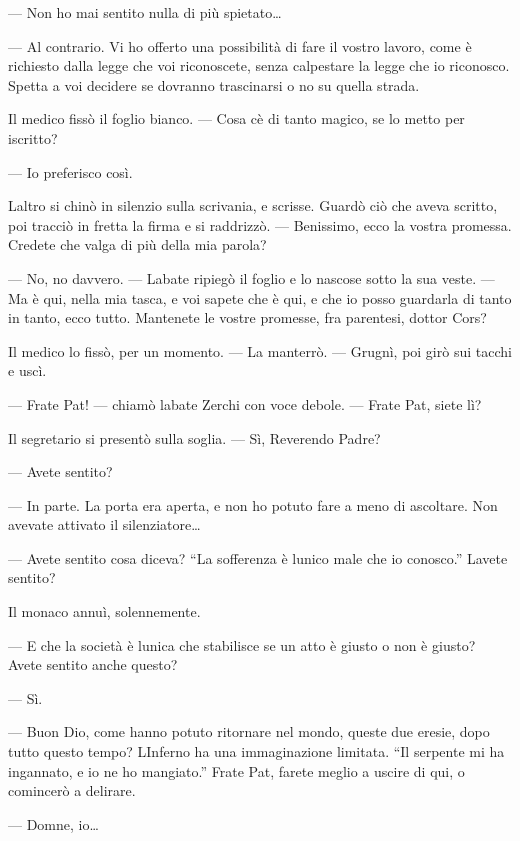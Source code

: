 --- Non ho mai sentito nulla di più spietato\ldots{}

--- Al contrario. Vi ho offerto una possibilità di fare il vostro
lavoro, come è richiesto dalla legge che voi riconoscete, senza
calpestare la legge che io riconosco. Spetta a voi decidere se dovranno
trascinarsi o no su quella strada.

Il medico fissò il foglio bianco. --- Cosa c\textquotesingle è di tanto
magico, se lo metto per iscritto?

--- Io preferisco così.

L\textquotesingle altro si chinò in silenzio sulla scrivania, e scrisse.
Guardò ciò che aveva scritto, poi tracciò in fretta la firma e si
raddrizzò. --- Benissimo, ecco la vostra promessa. Credete che valga di
più della mia parola?

--- No, no davvero. --- L\textquotesingle abate ripiegò il foglio e lo
nascose sotto la sua veste. --- Ma è qui, nella mia tasca, e voi sapete
che è qui, e che io posso guardarla di tanto in tanto, ecco tutto.
Mantenete le vostre promesse, fra parentesi, dottor Cors?

Il medico lo fissò, per un momento. --- La manterrò. --- Grugnì, poi
girò sui tacchi e uscì.

--- Frate Pat! --- chiamò l\textquotesingle abate Zerchi con voce
debole. --- Frate Pat, siete lì?

Il segretario si presentò sulla soglia. --- Sì, Reverendo Padre?

--- Avete sentito?

--- In parte. La porta era aperta, e non ho potuto fare a meno di
ascoltare. Non avevate attivato il silenziatore\ldots{}

--- Avete sentito cosa diceva? ``La sofferenza è l\textquotesingle unico
male che io conosco.'' L\textquotesingle avete sentito?

Il monaco annuì, solennemente.

--- E che la società è l\textquotesingle unica che stabilisce se un atto
è giusto o non è giusto? Avete sentito anche questo?

--- Sì.

--- Buon Dio, come hanno potuto ritornare nel mondo, queste due eresie,
dopo tutto questo tempo? L\textquotesingle Inferno ha una immaginazione
limitata. ``Il serpente mi ha ingannato, e io ne ho mangiato.'' Frate
Pat, farete meglio a uscire di qui, o comincerò a delirare.

--- Domne, io\ldots{}

